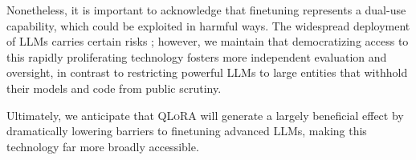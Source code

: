 Nonetheless, it is important to acknowledge that finetuning represents a dual-use capability, which could be exploited in harmful ways. The widespread deployment of LLMs carries certain risks \citep{bommasani2021opportunities,bender2021dangers}; however, we maintain that democratizing access to this rapidly proliferating technology fosters more independent evaluation and oversight, in contrast to restricting powerful LLMs to large entities that withhold their models and code from public scrutiny.

Ultimately, we anticipate that \textsc{QLoRA} will generate a largely beneficial effect by dramatically lowering barriers to finetuning advanced LLMs, making this technology far more broadly accessible.